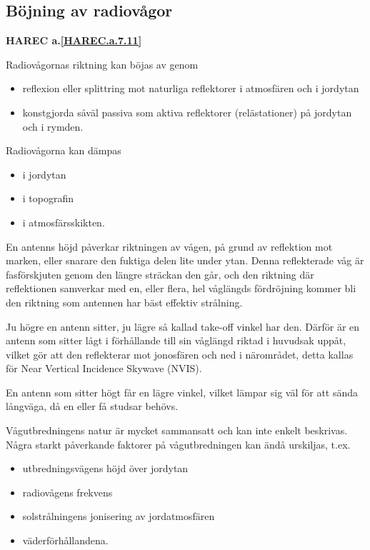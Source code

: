 \subsection{Böjning av radiovågor}
\textbf{HAREC a.\ref{HAREC.a.7.11}\label{myHAREC.a.7.11}}

Radiovågornas riktning kan böjas av genom
\begin{itemize}
  \item reflexion eller splittring mot naturliga reflektorer i
  atmosfären och i jordytan
  \item konstgjorda såväl passiva som aktiva reflektorer (relästationer)
  på jordytan och i rymden.
\end{itemize}

Radiovågorna kan dämpas
\begin{itemize}
  \item i jordytan
  \item i topografin
  \item i atmosfärsskikten.
\end{itemize}

En antenns höjd påverkar riktningen av vågen, på grund av reflektion mot
marken, eller snarare den fuktiga delen lite under ytan.
Denna reflekterade våg är fasförskjuten genom den längre sträckan den går,
och den riktning där reflektionen samverkar med en, eller flera, hel våglängds
fördröjning kommer bli den riktning som antennen har bäst effektiv strålning.

Ju högre en antenn sitter, ju lägre så kallad take-off vinkel har den.
Därför är en antenn som sitter lågt i förhållande till sin våglängd riktad i
huvudsak uppåt, vilket gör att den reflekterar mot jonosfären och ned i
närområdet, detta kallas för Near Vertical Incidence Skywave (NVIS). 

En antenn som sitter högt får en lägre vinkel, vilket lämpar sig väl för att
sända långväga, då en eller få studsar behövs.

Vågutbredningens natur är mycket sammansatt och kan inte enkelt beskrivas.
Några starkt påverkande faktorer på vågutbredningen kan ändå urskiljas, t.ex.
\begin{itemize}
  \item utbredningsvägens höjd över jordytan
  \item radiovågens frekvens
  \item solstrålningens jonisering av jordatmosfären
  \item väderförhållandena.
\end{itemize}

